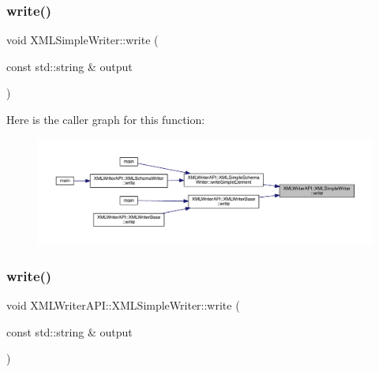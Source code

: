 \mbox{\label{classXMLWriterAPI_1_1XMLSimpleWriter_aea3a2b15335f16a80149d21976e3afa2}} 
\subsubsection{\texorpdfstring{write()}{write()}\hspace{0.1cm}{\footnotesize\ttfamily [2/30]}}
{\footnotesize\ttfamily void X\+M\+L\+Simple\+Writer\+::write (\begin{DoxyParamCaption}\item[{const std\+::string \&}]{output }\end{DoxyParamCaption})}

Here is the caller graph for this function\+:
\nopagebreak
\begin{figure}[H]
\begin{center}
\leavevmode
\includegraphics[width=350pt]{d5/de1/classXMLWriterAPI_1_1XMLSimpleWriter_aea3a2b15335f16a80149d21976e3afa2_icgraph}
\end{center}
\end{figure}
\mbox{\label{classXMLWriterAPI_1_1XMLSimpleWriter_a1c5de7aca63e28a5e02a3f054a2b2a75}} 
\subsubsection{\texorpdfstring{write()}{write()}\hspace{0.1cm}{\footnotesize\ttfamily [3/30]}}
{\footnotesize\ttfamily void X\+M\+L\+Writer\+A\+P\+I\+::\+X\+M\+L\+Simple\+Writer\+::write (\begin{DoxyParamCaption}\item[{const std\+::string \&}]{output }\end{DoxyParamCaption})}

